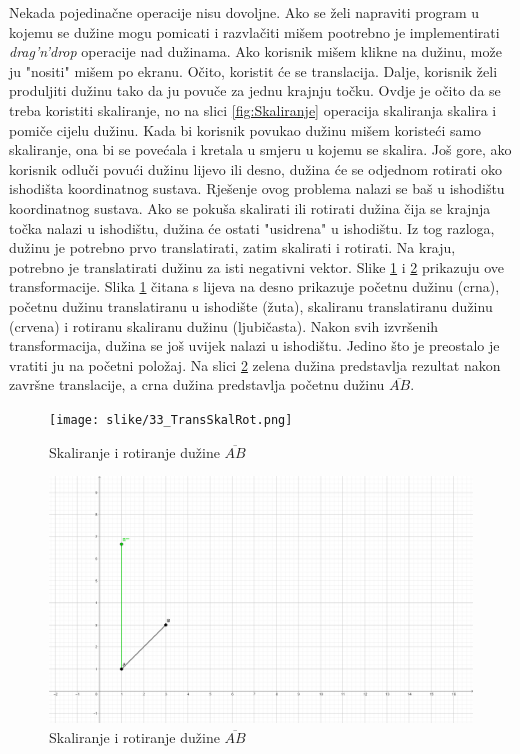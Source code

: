 \documentclass{foi}
\begin{document}
Nekada pojedinačne operacije nisu dovoljne. Ako se želi napraviti program u kojemu se dužine mogu pomicati i razvlačiti mišem pootrebno je implementirati \textit{drag'n'drop} operacije nad dužinama. Ako korisnik mišem klikne na dužinu, može ju "nositi" mišem po ekranu. Očito, koristit će se translacija. Dalje, korisnik želi produljiti dužinu tako da ju povuče za jednu krajnju točku. Ovdje je očito da se treba koristiti skaliranje, no na slici \ref{fig:Skaliranje} operacija skaliranja skalira i pomiče cijelu dužinu. Kada bi korisnik povukao dužinu mišem  koristeći samo skaliranje, ona bi se povećala i kretala u smjeru u kojemu se skalira. Još gore, ako korisnik odluči povući dužinu lijevo ili desno, dužina će se odjednom rotirati oko ishodišta koordinatnog sustava. Rješenje ovog problema nalazi se baš u ishodištu koordinatnog sustava. Ako se pokuša skalirati ili rotirati dužina čija se krajnja točka nalazi u ishodištu, dužina će ostati "usidrena" u ishodištu. Iz tog razloga, dužinu je potrebno prvo translatirati, zatim skalirati i rotirati. Na kraju, potrebno je translatirati dužinu za isti negativni vektor. Slike \ref{fig:TransSkalRot} i \ref{fig:TransSkalRotKraj} prikazuju ove transformacije. Slika \ref{fig:TransSkalRot} čitana s lijeva na desno prikazuje početnu dužinu (crna), početnu dužinu translatiranu u ishodište (žuta), skaliranu translatiranu dužinu (crvena) i rotiranu skaliranu dužinu (ljubičasta). Nakon svih izvršenih transformacija, dužina se još uvijek nalazi u ishodištu. Jedino što je preostalo je vratiti ju na početni položaj. Na slici \ref{fig:TransSkalRotKraj} zelena dužina predstavlja rezultat nakon završne translacije, a crna dužina predstavlja početnu dužinu $\overline{AB}$. 


\begin{figure}[H]
	\centering
	\texttt{[image: slike/33\_TransSkalRot.png]}
	\captionsetup{justification=centering}
	\caption{Skaliranje i rotiranje dužine $\overline{AB}$}
	\label{fig:TransSkalRot}
\end{figure}
\begin{figure}[H]
	\centering
	\includegraphics[width=1\textwidth]{slike/34_TransSkalRotKRAJ.png}
	\captionsetup{justification=centering}
	\caption{Skaliranje i rotiranje dužine $\overline{AB}$}
	\label{fig:TransSkalRotKraj}
\end{figure}
\end{document}
